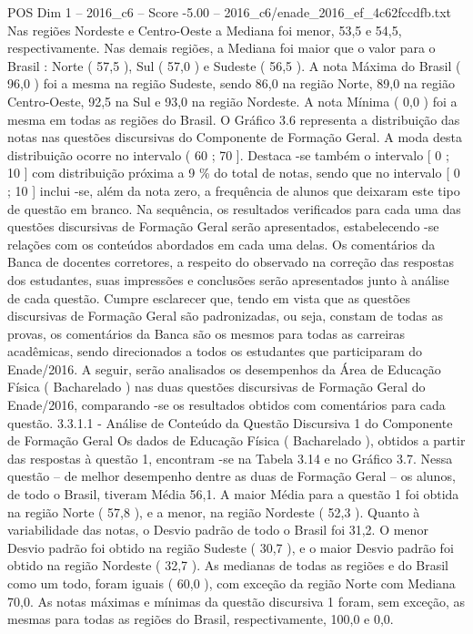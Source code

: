 \begin{textsample}{POS Dim 1 – 2016\_c6 – Score -5.00 – 2016\_c6/enade\_2016\_ef\_4c62fccdfb.txt}
Nas regiões Nordeste e Centro-Oeste a Mediana foi menor, 53,5 e 54,5, respectivamente.
Nas demais regiões, a Mediana foi maior que o valor para o Brasil : Norte ( 57,5 ), Sul ( 57,0 ) e Sudeste ( 56,5 ).
A nota Máxima do Brasil ( 96,0 ) foi a mesma na região Sudeste, sendo 86,0 na região Norte, 89,0 na região Centro-Oeste, 92,5 na Sul e 93,0 na região Nordeste.
A nota Mínima ( 0,0 ) foi a mesma em todas as regiões do Brasil.
O Gráfico 3.6 representa a distribuição das notas nas questões discursivas do Componente de Formação Geral.
A moda desta distribuição ocorre no intervalo ( 60 ; 70 ].
Destaca -se também o intervalo [ 0 ; 10 ] com distribuição próxima a 9 \% do total de notas, sendo que no intervalo [ 0 ; 10 ] inclui -se, além da nota zero, a frequência de alunos que deixaram este tipo de questão em branco.
Na sequência, os resultados verificados para cada uma das questões discursivas de Formação Geral serão apresentados, estabelecendo -se relações com os conteúdos abordados em cada uma delas.
Os comentários da Banca de docentes corretores, a respeito do observado na correção das respostas dos estudantes, suas impressões e conclusões serão apresentados junto à análise de cada questão.
Cumpre esclarecer que, tendo em vista que as questões discursivas de Formação Geral são padronizadas, ou seja, constam de todas as provas, os comentários da Banca são os mesmos para todas as carreiras acadêmicas, sendo direcionados a todos os estudantes que participaram do Enade/2016.
A seguir, serão analisados os desempenhos da Área de Educação Física ( Bacharelado ) nas duas questões discursivas de Formação Geral do Enade/2016, comparando -se os resultados obtidos com comentários para cada questão. 3.3.1.1 - Análise de Conteúdo da Questão Discursiva 1 do Componente de Formação Geral Os dados de Educação Física ( Bacharelado ), obtidos a partir das respostas à questão 1, encontram -se na Tabela 3.14 e no Gráfico 3.7.
Nessa questão – de melhor desempenho dentre as duas de Formação Geral – os alunos, de todo o Brasil, tiveram Média 56,1.
A maior Média para a questão 1 foi obtida na região Norte ( 57,8 ), e a menor, na região Nordeste ( 52,3 ).
Quanto à variabilidade das notas, o Desvio padrão de todo o Brasil foi 31,2.
O menor Desvio padrão foi obtido na região Sudeste ( 30,7 ), e o maior Desvio padrão foi obtido na região Nordeste ( 32,7 ).
As medianas de todas as regiões e do Brasil como um todo, foram iguais ( 60,0 ), com exceção da região Norte com Mediana 70,0.
As notas máximas e mínimas da questão discursiva 1 foram, sem exceção, as mesmas para todas as regiões do Brasil, respectivamente, 100,0 e 0,0.

\end{textsample}

